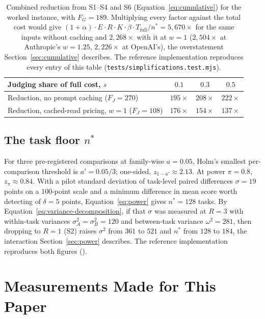 \documentclass[11pt]{article}
\newcommand{\sectionbreak}{\par\ifdim\pagetotal<5.5\baselineskip\relax\else\clearpage\fi}
\begin{document}
\begin{table}[h]
\centering
\begin{tabular}{lccc}
\toprule
Judging share of full cost, $s$ & $0.1$ & $0.3$ & $0.5$ \\
\midrule
Reduction, no prompt caching ($F_J = 270$) & $195\times$ & $208\times$ & $222\times$ \\
Reduction, cached-read pricing, $w = 1$ ($F_J = 108$) & $176\times$ & $154\times$ & $137\times$ \\
\bottomrule
\end{tabular}
\caption{Combined reduction from S1--S4 and S6 (Equation~\ref{eq:cumulative}) for the
worked instance, with $F_G = 189$. Multiplying every factor against the total cost
would give $(1+\alpha) \cdot E \cdot R \cdot K \cdot \beta \cdot T_{\text{full}}/n^* = 5{,}670\times$
for the same inputs without caching and $2{,}268\times$ with it at $w = 1$ ($2{,}504\times$ at Anthropic's $w = 1.25$, $2{,}226\times$ at OpenAI's), the overstatement
Section~\ref{sec:cumulative} describes. The reference implementation reproduces every entry of this table
(\texttt{tests/simplifications.test.mjs}).}
\label{tab:cumulative}
\end{table}

\subsection{The task floor \texorpdfstring{$n^*$}{n*}}

For three pre-registered comparisons at family-wise $a = 0.05$, Holm's smallest
per-comparison threshold is $a' = 0.05/3$; one-sided, $z_{1-a'} \approx 2.13$.
At power $\pi = 0.8$, $z_{\pi} \approx 0.84$. With a pilot standard deviation of task-level
paired differences $\sigma = 19$ points on a $100$-point scale and a minimum difference in mean score
worth detecting of $\delta = 5$ points, Equation~\ref{eq:power} gives $n^* = 128$ tasks.
By Equation~\ref{eq:variance-decomposition}, if that $\sigma$ was measured at $R = 3$
with within-task variances $\sigma_A^2 = \sigma_B^2 = 120$ and between-task variance
$\omega^2 = 281$, then dropping to $R = 1$ (S2) raises $\sigma^2$ from $361$ to $521$ and
$n^*$ from $128$ to $184$, the interaction Section~\ref{sec:power} describes. The
reference implementation reproduces both figures ().

\sectionbreak
\section{Measurements Made for This Paper}
\label{app:measurements}
\end{document}
